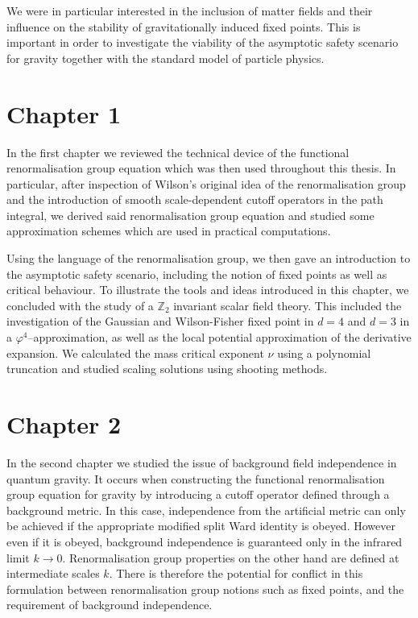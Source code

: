 \documentclass[11pt]{book}
\numberwithin{equation}{chapter}
\begin{document}
We were in particular interested in the inclusion of matter fields and their influence
on the stability of gravitationally induced fixed points.
This is important in order to investigate the viability of the asymptotic safety scenario
for gravity together with the standard model of particle physics.

\section*{Chapter 1}

In the first chapter we reviewed the technical device of the functional renormalisation
group equation which was then used throughout this thesis.
In particular, after inspection
of Wilson's original idea of the renormalisation group and the introduction
of smooth scale-dependent cutoff operators in the path integral, we derived
said renormalisation group equation and studied some approximation schemes
which are used in practical computations.

Using the language of the renormalisation group, we then gave an introduction
to the asymptotic safety scenario, including the notion of fixed points
as well as critical behaviour. To illustrate the tools and ideas introduced
in this chapter, we concluded with the study of a $\mathbb Z_2$ invariant
scalar field theory. This included the investigation of the
Gaussian and Wilson-Fisher fixed point in $d=4$ and $d=3$ in a
$\varphi^4$--approximation, as well as the local potential approximation
of the derivative expansion.
We calculated the mass critical exponent $\nu$ using a polynomial truncation
and studied scaling solutions using shooting methods.

\section*{Chapter 2}

In the second chapter we studied the issue of background field independence in quantum gravity.
It occurs when constructing the functional renormalisation group equation for gravity by introducing a
cutoff operator defined through a background metric. In this case, independence from the artificial
metric can only be achieved if the appropriate modified split Ward identity is obeyed.
However even if it is obeyed, background independence is guaranteed
only in the infrared limit $k\to0$.
Renormalisation group properties on the other hand are defined at intermediate scales $k$.
There is therefore the potential for conflict in this formulation between
renormalisation group notions such as fixed points,
and the requirement of background independence.
\end{document}
